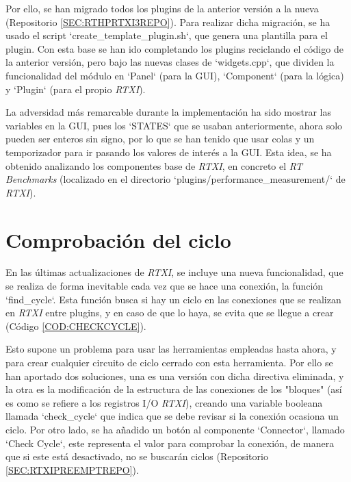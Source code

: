 Por ello, se han migrado todos los plugins de la anterior versión a la nueva (Repositorio \ref{SEC:RTHPRTXI3REPO}). Para realizar dicha migración, se ha usado el script `create\_template\_plugin.sh`, que genera una plantilla para el plugin. Con esta base se han ido completando los plugins reciclando el código de la anterior versión, pero bajo las nuevas clases de `widgets.cpp`, que dividen la funcionalidad del módulo en `Panel` (para la GUI), `Component` (para la lógica) y `Plugin` (para el propio \textit{RTXI}).

La adversidad más remarcable durante la implementación ha sido mostrar las variables en la GUI, pues los `STATES` que se usaban anteriormente, ahora solo pueden ser enteros sin signo, por lo que se han tenido que usar colas y un temporizador para ir pasando los valores de interés a la GUI. Esta idea, se ha obtenido analizando los componentes base de \textit{RTXI}, en concreto el \textit{RT Benchmarks} (localizado en el directorio `plugins/performance\_measurement/` de \textit{RTXI}).


\section{Comprobación del ciclo\label{SEC:COMPROBARCICLO}}


En las últimas actualizaciones de \textit{RTXI}, se incluye una nueva funcionalidad, que se realiza de forma inevitable cada vez que se hace una conexión, la función `find\_cycle`. Esta función busca si hay un ciclo en las conexiones que se realizan en \textit{RTXI} entre plugins, y en caso de que lo haya, se evita que se llegue a crear (Código \ref{COD:CHECKCYCLE}).

Esto supone un problema para usar las herramientas empleadas hasta ahora, y para crear cualquier circuito de ciclo cerrado con esta herramienta. Por ello se han aportado dos soluciones, una es una versión con dicha directiva eliminada, y la otra es la modificación de la estructura de las conexiones de los "bloques" (así es como se refiere a los registros I/O \textit{RTXI}), creando una variable booleana llamada `check\_cycle` que indica que se debe revisar si la conexión ocasiona un ciclo. Por otro lado, se ha añadido un botón al componente `Connector`, llamado `Check Cycle`, este representa el valor para comprobar la conexión, de manera que si este está desactivado, no se buscarán ciclos (Repositorio \ref{SEC:RTXIPREEMPTREPO}).

